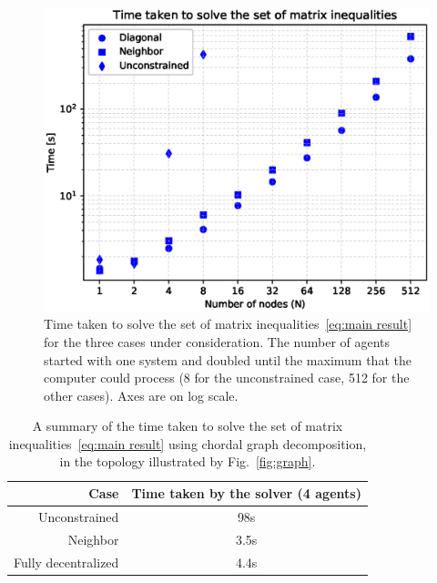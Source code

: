 \documentclass[10pt,twocolumn,twoside]{IEEEtran}
\theoremstyle{plain}
\theoremstyle{definition}
\theoremstyle{remark}
\begin{document}
\begin{figure}[htpb!]
	\centering
	\includegraphics[width=\columnwidth]{./imgs/ParserTimes}\vspace{-2em}
	\caption{Time taken to solve the set of matrix inequalities~\eqref{eq:main result} for the three cases under consideration. The number of agents started with one system and doubled  until the maximum that the computer could process (8 for the unconstrained case, 512 for the other cases). Axes are on log scale.}
	\label{fig:time graph}
\end{figure}

\begin{table}
	\begin{tabular}{r|c}
	Case&Time taken by the solver (4 agents)\\ \hline
	Unconstrained&98s\\
	Neighbor&3.5s\\
	Fully decentralized&4.4s\\\hline
	\end{tabular}\vspace{1em}
	\caption{A summary of the time taken to solve the set of matrix inequalities~\eqref{eq:main result} using chordal graph decomposition, in the topology illustrated by Fig.~\ref{fig:graph}.}
	\label{tab:chain case}
\end{table}
\end{document}
